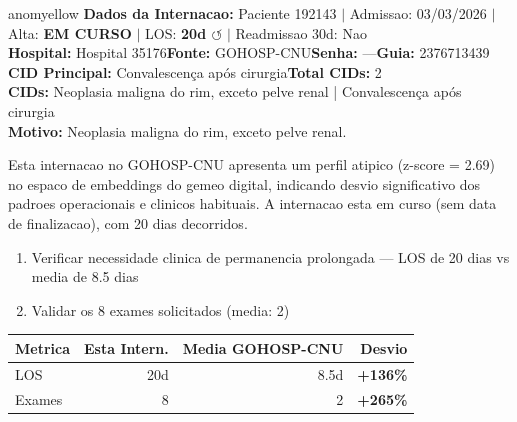 \documentclass[a4paper,10pt]{article}
\begin{document}
\begin{anomalycard}[Internacao 261907 | GOHOSP-CNU | MODERADO (z=2.69)]{anomyellow}
\textbf{Dados da Internacao:} Paciente 192143 $\mid$ Admissao: 03/03/2026 $\mid$ Alta: \textcolor{anomorange}{\textbf{EM CURSO}} $\mid$ LOS: \textbf{20d \textcolor{anomorange}{$\circlearrowleft$}} $\mid$ Readmissao 30d: Nao\\
\textbf{Hospital:} Hospital 35176\quad\textbf{Fonte:} GOHOSP-CNU\quad\textbf{Senha:} ---\quad\textbf{Guia:} 2376713439\\
\textbf{CID Principal:} {\small Convalescença após cirurgia}\quad\textbf{Total CIDs:} 2\\

\textbf{CIDs:} {\scriptsize Neoplasia maligna do rim, exceto pelve renal | Convalescença após cirurgia}\\

\textbf{Motivo:} {\scriptsize Neoplasia maligna do rim, exceto pelve renal.}\\

\vspace{2pt}\begin{tcolorbox}[colback=severityred!20,colframe=anomyellow,title={\textbf{Interpretacao de Negocio}},fonttitle=\bfseries\small,left=4pt,right=4pt,top=3pt,bottom=3pt]
{\small Esta internacao no GOHOSP-CNU apresenta um perfil atipico (z-score = 2.69) no espaco de embeddings do gemeo digital, indicando desvio significativo dos padroes operacionais e clinicos habituais. A internacao esta em curso (sem data de finalizacao), com 20 dias decorridos.}
\end{tcolorbox}
\begin{tcolorbox}[colback=severityyellow!30,colframe=anomorange,title={\textbf{Recomendacoes Especificas}},fonttitle=\bfseries\small,left=4pt,right=4pt,top=3pt,bottom=3pt]
\begin{enumerate}[nosep,leftmargin=16pt]
\item {\small Verificar necessidade clinica de permanencia prolongada --- LOS de 20 dias vs media de 8.5 dias}
\item {\small Validar os 8 exames solicitados (media: 2)}
\end{enumerate}
\end{tcolorbox}
\begin{center}\begin{tabular}{l r r r}\toprule\textbf{Metrica} & \textbf{Esta Intern.} & \textbf{Media GOHOSP-CNU} & \textbf{Desvio} \\\midrule
LOS & 20d & 8.5d & \textcolor{anomred}{\textbf{+136\%}} \\
Exames & 8 & 2 & \textcolor{anomred}{\textbf{+265\%}} \\
\bottomrule\end{tabular}\end{center}


\end{anomalycard}
\end{document}

